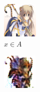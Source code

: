 \documentclass[twocolumn,11pt]{ctexart}
\begin{document}
\begin{figure}[htb]
    \centering
    \begin{subfigure}[b]{0.23\linewidth}
        \includegraphics[width=\linewidth]{exp2_epoch004_real_A.png}
        \caption{$x \in A$}
      \end{subfigure}
      \begin{subfigure}[b]{0.23\linewidth}
        \includegraphics[width=\linewidth]{exp2_epoch004_fake_B.png}

\end{subfigure}
\end{figure}
\end{document}
